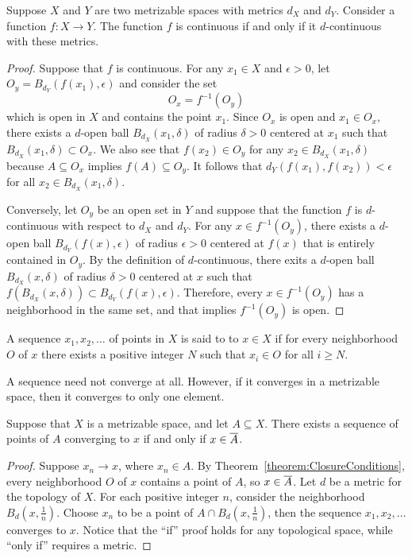 \begin{theorem}
Suppose $X$ and $Y$ are two metrizable spaces with metrics $d_X$ and $d_Y$.
Consider a function $f : X \rightarrow Y$.
The function $f$ is continuous if and only if it $d$-continuous with these metrics.
\end{theorem}
\begin{proof}
Suppose that $f$ is continuous.
For any $x_1 \in X$ and $\epsilon > 0$, let $O_y =  B_{d_Y} (f(x_1), \epsilon)$ and consider the set
\begin{equation*}
O_x = f^{-1} \left( O_y \right)
\end{equation*}
which is open in $X$ and contains the point $x_1$.
Since $O_x$ is open and $x_1 \in O_x$, there exists a $d$-open ball $B_{d_X} (x_1, \delta)$ of radius $\delta>0$ centered at $x_1$ such that $B_{d_X} (x_1, \delta) \subset O_x$.
We also see that $f(x_2) \in O_y$ for any $x_2 \in B_{d_X} (x_1, \delta)$ because $A \subseteq O_x$ implies $f(A) \subseteq O_y$.
It follows that $d_Y \left( f(x_1), f(x_2) \right) < \epsilon$ for all $x_2 \in B_{d_X} (x_1, \delta)$.

Conversely, let $O_y$ be an open set in $Y$ and suppose that the function $f$ is $d$-continuous with respect to $d_X$ and $d_Y$.
For any $x \in f^{-1} (O_y)$, there exists a $d$-open ball $B_{d_Y} (f(x), \epsilon)$ of radius $\epsilon>0$ centered at $f(x)$ that is entirely contained in $O_y$.
By the definition of $d$-continuous, there exits a $d$-open ball $B_{d_X} (x, \delta)$ of radius $\delta>0$ centered at $x$ such that $f \left( B_{d_X} (x,\delta) \right) \subset B_{d_Y} \left( f(x), \epsilon \right)$.
Therefore, every $x \in f^{-1}(O_y)$ has a neighborhood in the same set, and that implies $f^{-1} (O_y)$ is open.
\end{proof}

\begin{definition} \label{definition:SequenceConvergence}
A sequence $x_1, x_2, \ldots$ of points in $X$ is said to  to $x \in X$ if for every neighborhood $O$ of $x$ there exists a positive integer $N$ such that $x_i \in O$ for all $i \geq N$.
\end{definition}

A sequence need not converge at all.
However, if it converges in a metrizable space, then it converges to only one element.

\begin{theorem}
Suppose that $X$ is a metrizable space, and let $A \subseteq X$.
There exists a sequence of points of $A$ converging to $x$ if and only if $x \in \overline{A}$.
\end{theorem}
\begin{proof}
Suppose $x_n \rightarrow x$, where $x_n \in A$.
By Theorem~\ref{theorem:ClosureConditions}, every neighborhood $O$ of $x$ contains a point of $A$, so $x \in \overline{A}$.
Let $d$ be a metric for the topology of $X$.
For each positive integer $n$, consider the neighborhood $B_d \left( x, \frac{1}{n} \right)$.
Choose $x_n$ to be a point of $A \cap B_d \left( x, \frac{1}{n} \right)$,
then the sequence $x_1, x_2, \ldots$ converges to $x$.
Notice that the ``if'' proof holds for any topological space, while ``only if'' requires a metric.
\end{proof}


